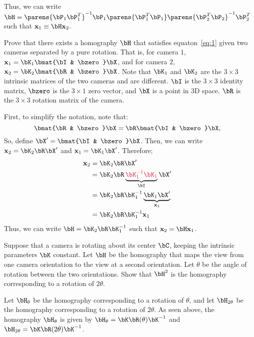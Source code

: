 \begin{problem}
\begin{enumroman}
\begin{answer}
        Thus, we can write $\bH = \parens{\bP_1 \bP_1^{T}}^{-1} \bP_1 \parens{\bP_1^T \bP_1} \parens{\bP_2^T \bP_2}^{-1} \bP_2^T$ such that $\bx_1 \equiv \bH \bx_2$.

      \end{answer}

    \item Prove that there exists a homography $\bH$ that satisfies equaton~\ref{eq:1}
      given two cameras separated by a pure rotation.
      That is, for camera $1$, $\bx_1 = \bK_1 \bmat{\bI & \bzero} \bX$,
      and for camera $2$, $\bx_2 = \bK_2 \bmat{\bR & \bzero} \bX$.
      Note that $\bK_1$ and $\bK_2$ are the $3 \times 3$ intrinsic matrices
      of the two cameras and are different. $\bI$ is the $3 \times 3$ identity matrix,
      $\bzero$ is the $3 \times 1$ zero vector, and $\bX$ is a point in 3D space.
      $\bR$ is the $3 \times 3$ rotation matrix of the camera.

      \begin{answer}
        First, to simplify the notation, note that:
        \[ \bmat{\bR & \bzero} \bX = \bR \bmat{\bI & \bzero} \bX, \]
        So, define $\bX' = \bmat{\bI & \bzero} \bX$.
        Then, we can write $\bx_2 = \bK_2 \bR \bX'$ and $\bx_1 = \bK_1 \bX'$.
        Therefore;
        \begin{align*}
          \bx_2 &= \bK_2 \bR \bX' \\
                &= \bK_2 \bR \underbrace{\crim{\bK_1^{-1} \bK_1}}_{\bI} \bX' \\
                &= \bK_2 \bR \bK_1^{-1} \underbrace{\bK_1 \bX'}_{\bx_1} \\
                &= \bK_2 \bR \bK_1^{-1} \bx_1
        \end{align*}
        Thus, we can write $\bH = \bK_2 \bR \bK_1^{-1}$
        such that $\bx_2 = \bH \bx_1$.

      \end{answer}

    \newpage
    \item Suppose that a camera is rotating about its center $\bC$,
      keeping the intrinsic parameters $\bK$ constant.
      Let $\bH$ be the homography that maps the view from one camera orientation
      to the view at a second orientation.
      Let $\theta$ be the angle of rotation between the two orientations.
      Show that $\bH^2$ is the homography corresponding to a rotation of $2\theta$.

      \begin{answer}
        Let $\bH_\theta$ be the homography corresponding to a rotation of $\theta$,
        and let $\bH_{2\theta}$ be the homography corresponding to a rotation of $2\theta$.
        As seen above, the homography $\bH_\theta$ is given by $\bH_\theta = \bK \bR(\theta) \bK^{-1}$
        and $\bH_{2\theta} = \bK \bR(2\theta) \bK^{-1}$.


\end{answer}
\end{enumroman}
\end{problem}
